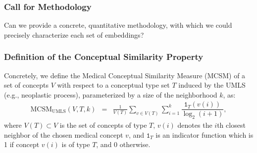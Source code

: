 \documentclass{beamer}
\begin{document}
\begin{frame}
\frametitle{Call for Methodology}
\begin{center}
Can we provide a concrete, quantitative methodology,
with which we could precisely characterize each set of embeddings?
\end{center}
\end{frame}
\begin{frame}
\frametitle{Definition of the 
Conceptual Similarity Property}

Concretely, we define the Medical Conceptual Similarity Measure (MCSM) 
of a set of concepts $V$
with respect to a conceptual type set $T$ induced by the UMLS (e.g.,
neoplastic process), parameterized by 
a size of the neighborhood $k$, as: %
\begin{eqnarray*}
\text{MCSM}_{\text{UMLS}}(V,T,k) &=& \frac{1}{V(T)}\sum_{v \in V(T)} \sum_{i=1}^{k} \dfrac{ \mathtt{1}_{T}(v(i)) }{\log_2(i+1)},
\end{eqnarray*}
where $V(T)\subset V$ is the set of concepts of type $T$, $v(i)$ denotes the $i$th closest neighbor of the chosen medical concept $v$,
and $\mathtt{1}_{T}$ is an indicator function which is 1 if concept
$v(i)$ is of type $T$, and $0$ otherwise.
\end{frame}
\end{document}
